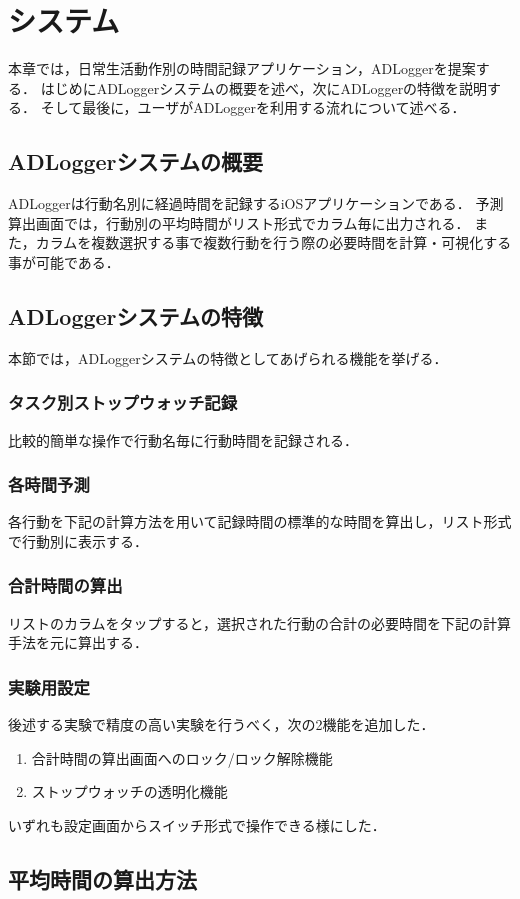 \chapter{システム}
本章では，日常生活動作別の時間記録アプリケーション，ADLoggerを提案する．
はじめにADLoggerシステムの概要を述べ，次にADLoggerの特徴を説明する．
そして最後に，ユーザがADLoggerを利用する流れについて述べる．

\section{ADLoggerシステムの概要}
ADLoggerは行動名別に経過時間を記録するiOSアプリケーションである．
予測算出画面では，行動別の平均時間がリスト形式でカラム毎に出力される．
また，カラムを複数選択する事で複数行動を行う際の必要時間を計算・可視化する事が可能である．

\section{ADLoggerシステムの特徴}
本節では，ADLoggerシステムの特徴としてあげられる機能を挙げる．
\subsection{タスク別ストップウォッチ記録}
比較的簡単な操作で行動名毎に行動時間を記録される．
\subsection{各時間予測}
各行動を下記の計算方法を用いて記録時間の標準的な時間を算出し，リスト形式で行動別に表示する．
\subsection{合計時間の算出}
リストのカラムをタップすると，選択された行動の合計の必要時間を下記の計算手法を元に算出する．
\subsection{実験用設定}
後述する実験で精度の高い実験を行うべく，次の2機能を追加した．
\begin{enumerate}
  \item 合計時間の算出画面へのロック/ロック解除機能
  \item ストップウォッチの透明化機能
\end{enumerate}
いずれも設定画面からスイッチ形式で操作できる様にした．

\section{平均時間の算出方法}
